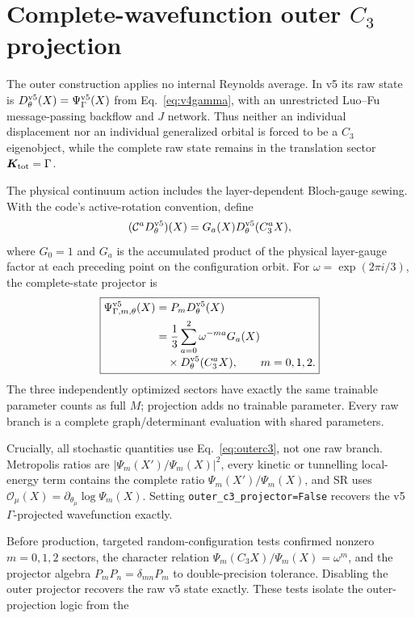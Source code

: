 \section{Complete-wavefunction outer $C_3$ projection}
\label{sec:outerc3}

The outer construction applies no internal Reynolds average. In v5 its raw
state is $D_\theta^{\rm v5}(X)=\Psi_\Gamma^{\rm v5}(X)$ from
Eq.~\eqref{eq:v4gamma},
with an unrestricted Luo--Fu message-passing backflow and $J$ network. Thus
neither an individual displacement nor an individual generalized orbital is
forced to be a $C_3$ eigenobject, while the complete raw state remains in the
translation sector $\bm K_{\rm tot}=\Gamma$.

The physical continuum action includes the layer-dependent Bloch-gauge sewing.
With the code's active-rotation convention, define
\begin{equation}
 (\mathcal C^aD_\theta^{\rm v5})(X)
 =G_a(X)D_\theta^{\rm v5}(C_3^aX),
\end{equation}
where $G_0=1$ and $G_a$ is the accumulated product of the physical layer-gauge
factor at each preceding point on the configuration orbit.  For
$\omega=\exp(2\pi i/3)$, the complete-state projector is
\begin{equation}
 \boxed{\begin{aligned}
 \Psi_{\Gamma,m,\theta}^{\rm v5}(X)&=P_mD_\theta^{\rm v5}(X)\\
 &=\frac13\sum_{a=0}^{2}\omega^{-ma}G_a(X)\\[-2pt]
 &\quad\times D_\theta^{\rm v5}(C_3^aX),\qquad m=0,1,2 .
 \end{aligned}}
 \label{eq:outerc3}
\end{equation}
The three independently optimized sectors have exactly the same trainable
parameter counts as full $M$; projection adds no trainable parameter. Every raw
branch is a complete graph/determinant evaluation with shared parameters.

Crucially, all stochastic quantities use Eq.~\eqref{eq:outerc3}, not one raw
branch.  Metropolis ratios are $|\Psi_m(X')/\Psi_m(X)|^2$, every kinetic or
tunnelling local-energy term contains the complete ratio
$\Psi_m(X')/\Psi_m(X)$, and SR uses
$\mathcal O_\mu(X)=\partial_{\theta_\mu}\log\Psi_m(X)$.  Setting
\texttt{outer\_c3\_projector=False} recovers the v5 $\Gamma$-projected
wavefunction exactly.

Before production, targeted random-configuration tests confirmed nonzero
$m=0,1,2$ sectors, the character relation
$\Psi_m(C_3X)/\Psi_m(X)=\omega^m$, and the projector algebra
$P_mP_n=\delta_{mn}P_m$ to double-precision tolerance. Disabling the outer
projector recovers the raw v5 state exactly. These tests isolate the
outer-projection logic from the


